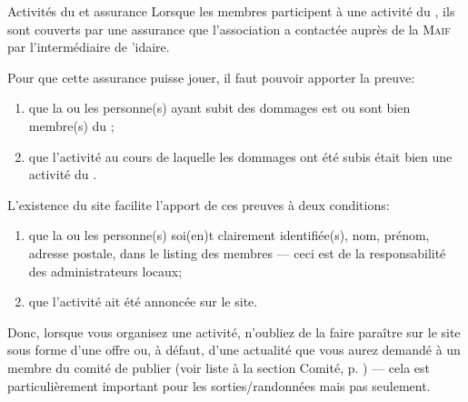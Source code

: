 \begin{mybox}[colbacktitle=MidnightBlue]{Activités du \sel{} et assurance}
    Lorsque les membres participent à une activité du \CdS, ils sont couverts par une assurance que l'association a contactée auprès de la \textsc{Maif} par l'intermédiaire de \sel'idaire.
    
    Pour que cette assurance puisse jouer, il faut pouvoir apporter la preuve:
    \begin{enumerate}
        \item que la ou les personne(s) ayant subit des dommages est ou sont bien membre(s) du \CdS;
        \item que l'activité au cours de laquelle les dommages ont été subis était bien une activité du \CdS.
    \end{enumerate}
    L'existence du site \CF{} facilite l'apport de ces preuves à deux conditions:
    \begin{enumerate}
        \item que la ou les personne(s) soi(en)t clairement identifiée(s), nom, prénom, adresse postale, dans le listing des membres --- ceci est de la responsabilité des administrateurs locaux;
        \item que l'activité ait été annoncée sur le site.
    \end{enumerate} 
    Donc, lorsque vous organisez une activité, n'oubliez de la faire paraître sur le site sous forme d'une offre ou, à défaut,  d'une actualité que vous aurez demandé à un membre du comité de publier (voir liste à la section \og{}Comité\fg, p. \pageref{sec:comite}) --- cela est particulièrement important pour les sorties/randonnées mais pas seulement.  
    \end{mybox}
    

